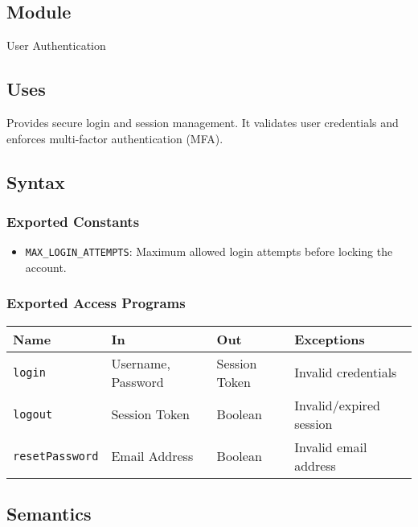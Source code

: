 \documentclass[12pt, titlepage]{article}
\begin{document}
\subsection{Module}

User Authentication

\subsection{Uses}

Provides secure login and session management. It validates user credentials and enforces multi-factor authentication (MFA).

\subsection{Syntax}

\subsubsection{Exported Constants}
\begin{itemize}
    \item \texttt{MAX\_LOGIN\_ATTEMPTS}: Maximum allowed login attempts before locking the account.
\end{itemize}

\subsubsection{Exported Access Programs}

\begin{center}
\begin{tabular}{p{3cm} p{4cm} p{3cm} p{3.5cm}}
\hline
\textbf{Name} & \textbf{In} & \textbf{Out} & \textbf{Exceptions} \\
\hline
\texttt{login} & Username, Password & Session Token & Invalid credentials \\
\texttt{logout} & Session Token & Boolean & Invalid/expired session \\
\texttt{resetPassword} & Email Address & Boolean & Invalid email address \\
\hline
\end{tabular}
\end{center}

\subsection{Semantics}
\end{document}
